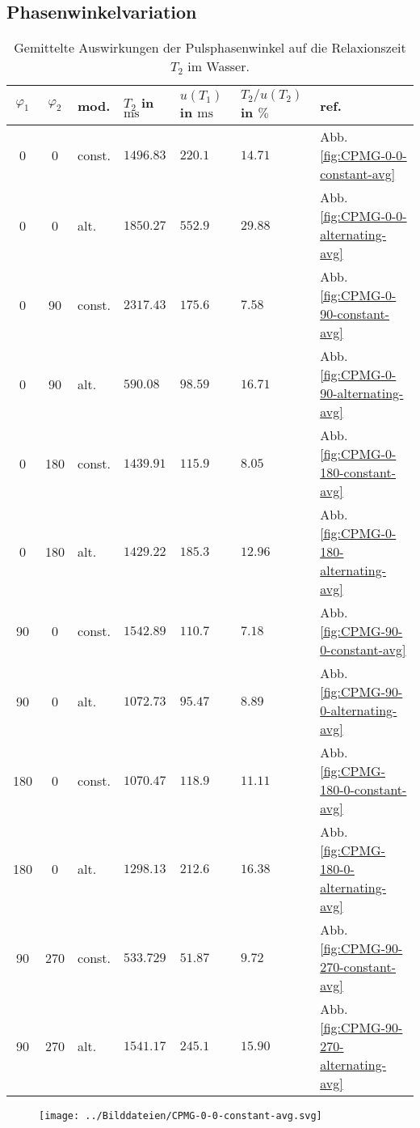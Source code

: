 \documentclass{article}
\begin{document}
    \subsection*{Phasenwinkelvariation}

        \begin{table}[H]
            \centering
            \begin{tabular}{c|c|l|lll|l}
                $\varphi_1$ & $\varphi_2$ & mod. & $T_2$ in $\si{\ms}$ & $u(T_1)$ in $\si{\ms}$ & $T_2/u(T_2)$ in $\si{\percent}$ & ref. \\
                \hline\hline
                0 & 0 & const. & $1496.83$ & $220.1$ & $14.71$ & Abb. \ref{fig:CPMG-0-0-constant-avg} \\
                0 & 0 & alt. & $1850.27$ & $552.9$ & $29.88$ & Abb. \ref{fig:CPMG-0-0-alternating-avg} \\
                \hline
                0 & 90 & const. & $2317.43$ & $175.6$ & $7.58$ & Abb. \ref{fig:CPMG-0-90-constant-avg} \\
                0 & 90 & alt. & $590.08$ & $98.59$ & $16.71$ & Abb. \ref{fig:CPMG-0-90-alternating-avg} \\
                \hline
                0 & 180 & const. & $1439.91$ & $115.9$ & $8.05$ & Abb. \ref{fig:CPMG-0-180-constant-avg} \\
                0 & 180 & alt. & $1429.22$ & $185.3$ & $12.96$ & Abb. \ref{fig:CPMG-0-180-alternating-avg} \\
                \hline
                90 & 0 & const. & $1542.89$ & $110.7$ & $7.18$ & Abb. \ref{fig:CPMG-90-0-constant-avg} \\
                90 & 0 & alt. & $1072.73$ & $95.47$ & $8.89$ & Abb. \ref{fig:CPMG-90-0-alternating-avg} \\
                \hline
                180 & 0 & const. & $1070.47$ & $118.9$ & $11.11$ & Abb. \ref{fig:CPMG-180-0-constant-avg} \\
                180 & 0 & alt. & $1298.13$ & $212.6$ & $16.38$ & Abb. \ref{fig:CPMG-180-0-alternating-avg} \\
                \hline
                90 & 270 & const. & $533.729$ & $51.87$ & $9.72$ & Abb. \ref{fig:CPMG-90-270-constant-avg} \\
                90 & 270 & alt. & $1541.17$ & $245.1$ & $15.90$ & Abb. \ref{fig:CPMG-90-270-alternating-avg} \\
            \end{tabular}
            \caption{Gemittelte Auswirkungen der Pulsphasenwinkel auf die Relaxionszeit $T_2$ im Wasser.}
        \end{table}

        \begin{figure}
            \centering
            \texttt{[image: ../Bilddateien/CPMG-0-0-constant-avg.svg]}
        \end{figure}
\end{document}
